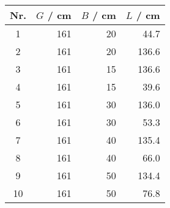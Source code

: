 \begin{tabular}{c|rrr}
Nr. & $G$ / cm & $B$ / cm & $L$ / cm \\
\hline
1 & 161 & 20 & 44.7\\
2 & 161 & 20 & 136.6\\
3 & 161 & 15 & 136.6\\
4 & 161 & 15 & 39.6\\
5 & 161 & 30 & 136.0\\
6 & 161 & 30 & 53.3\\
7 & 161 & 40 & 135.4\\
8 & 161 & 40 & 66.0\\
9 & 161 & 50 & 134.4\\
10 & 161 & 50 & 76.8
\end{tabular}
